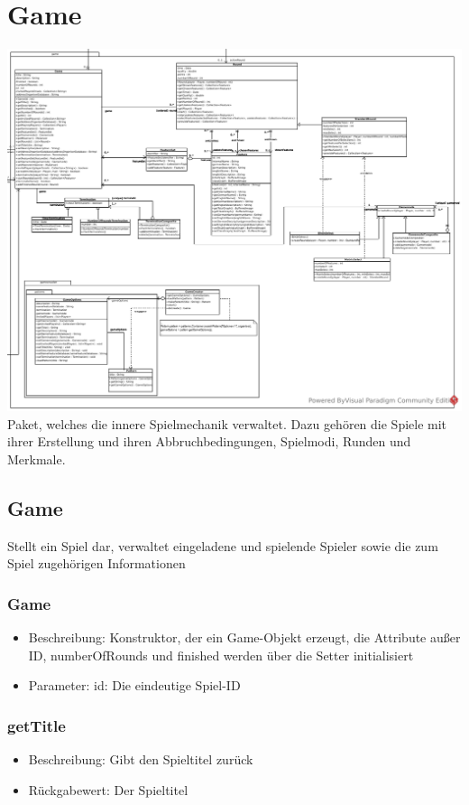 \documentclass[a4paper]{scrreprt}
\begin{document}
    \section{Game}
    \includegraphics[width=\textwidth]{img/package/game.pdf}
    Paket, welches die innere Spielmechanik verwaltet. Dazu gehören die Spiele mit ihrer Erstellung und ihren Abbruchbedingungen, Spielmodi, Runden und Merkmale.

    \subsection{Game}
    Stellt ein Spiel dar, verwaltet eingeladene und spielende Spieler sowie die zum Spiel zugehörigen Informationen
    \subsubsection{Game}
    \begin{itemize}
        \item Beschreibung: Konstruktor, der ein Game-Objekt erzeugt, die Attribute außer ID, numberOfRounds und finished werden über die Setter initialisiert
        \item Parameter: id: Die eindeutige Spiel-ID
    \end{itemize}

    \subsubsection{getTitle}
    \begin{itemize}
        \item Beschreibung: Gibt den Spieltitel zurück
        \item Rückgabewert: Der Spieltitel
    \end{itemize}
\end{document}
